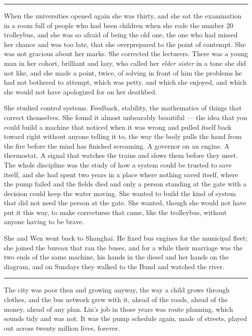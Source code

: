 \begin{center}\rule{0.3\linewidth}{0.4pt}\end{center}

When the universities opened again she was thirty, and she sat the examination in a room full of people who had been children when she rode the number 20 trolleybus, and she was so afraid of being the old one, the one who had missed her chance and was too late, that she overprepared to the point of contempt. She was not gracious about her marks. She corrected the lecturers. There was a young man in her cohort, brilliant and lazy, who called her \emph{elder sister} in a tone she did not like, and she made a point, twice, of solving in front of him the problems he had not bothered to attempt, which was petty, and which she enjoyed, and which she would not have apologized for on her deathbed.

She studied control systems. Feedback, stability, the mathematics of things that correct themselves. She found it almost unbearably beautiful --- the idea that you could build a machine that noticed when it was wrong and pulled itself back toward right without anyone telling it to, the way the body pulls the hand from the fire before the mind has finished screaming. A governor on an engine. A thermostat. A signal that watches the trains and slows them before they meet. The whole discipline was the study of how a system could be trusted to save itself, and she had spent two years in a place where nothing saved itself, where the pump failed and the fields died and only a person standing at the gate with a decision could keep the water moving. She wanted to build the kind of system that did not need the person at the gate. She wanted, though she would not have put it this way, to make correctness that came, like the trolleybus, without anyone having to be brave.

She and Wen went back to Shanghai. He fixed bus engines for the municipal fleet; she joined the bureau that ran the buses, and for a while their marriage was the two ends of the same machine, his hands in the diesel and her hands on the diagram, and on Sundays they walked to the Bund and watched the river.

\begin{center}\rule{0.3\linewidth}{0.4pt}\end{center}

The city was poor then and growing anyway, the way a child grows through clothes, and the bus network grew with it, ahead of the roads, ahead of the money, ahead of any plan. Lin's job in those years was route planning, which sounds tidy and was not. It was the pump schedule again, made of streets, played out across twenty million lives, forever.

